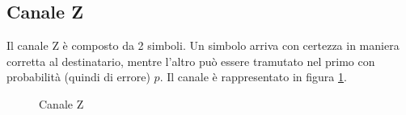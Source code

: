 \subsection{Canale Z}
Il canale Z è composto da 2 simboli. Un simbolo arriva con certezza in maniera corretta al destinatario, mentre l'altro può essere 
tramutato nel primo con probabilità (quindi di errore) $p$. Il canale è rappresentato in figura \ref{fig:z}.

\begin{figure}[htbp]
  \centering
  \hspace{1cm}
  \caption{Canale Z}
  \label{fig:z}
\end{figure}

